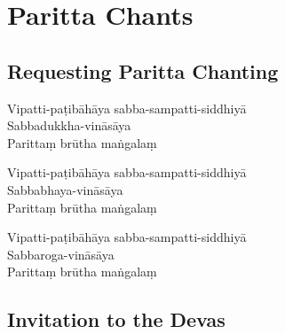 \chapter{Paritta Chants}

\section{Requesting Paritta Chanting}


\begin{paritta}

Vipatti-paṭibāhāya sabba-sampatti-siddhiyā\\
Sabbadukkha-vināsāya\\
Parittaṃ brūtha maṅgalaṃ

Vipatti-paṭibāhāya sabba-sampatti-siddhiyā\\
Sabbabhaya-vināsāya\\
Parittaṃ brūtha maṅgalaṃ

Vipatti-paṭibāhāya sabba-sampatti-siddhiyā\\
Sabbaroga-vināsāya\\
Parittaṃ brūtha maṅgalaṃ

\end{paritta}


\clearpage

\section{Invitation to the Devas}


